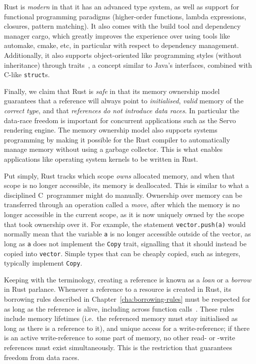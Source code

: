 \documentclass[11pt,a4paper,twoside,openany,draft]{report}
\newcommand{\InRust}[1]{\texttt{#1}}
\begin{document}
Rust is \textit{modern} in that it has an advanced type system, as well as
support for functional programming paradigms (higher-order functions, lambda
expressions, closures, pattern matching). It also comes with the build tool and
dependency manager cargo, which greatly improves the experience over using tools
like automake, cmake, etc, in particular with respect to dependency management.
Additionally, it also supports object-oriented like programming styles (without
inheritance) through traits~\cite{scharli2003traits}, a concept similar to
Java's interfaces, combined with C-like \InRust{struct}s.

Finally, we claim that Rust is \textit{safe} in that its memory ownership model
guarantees that a reference will always point to \textit{initialised},
\textit{valid} memory of the \textit{correct type}, and that \textit{references
  do not introduce data races}. In particular the data-race freedom is important
for concurrent applications such as the Servo rendering engine. The memory
ownership model also supports systems programming by making it possible for the
Rust compiler to automatically manage memory without using a garbage collector.
This is what enables applications like operating system kernels to be written in
Rust.

Put simply, Rust tracks which scope \textit{owns} allocated memory, and when
that scope is no longer accessible, its memory is deallocated. This is similar
to what a disciplined C~programmer might do manually. Ownership over memory can
be transferred through an operation called a \textit{move}, after which the
memory is no longer accessible in the current scope, as it is now uniquely owned
by the scope that took ownership over it. For example, the statement
\InRust{vector.push(a)} would normally mean that the variable \InRust{a} is no
longer accessible outside of the vector, as long as \InRust{a} does not
implement the \InRust{Copy} trait, signalling that it should instead be copied
into \InRust{vector}. Simple types that can be cheaply copied, such as integers,
typically implement \InRust{Copy}.

Keeping with the terminology, creating a reference is known as a \textit{loan}
or a \textit{borrow} in Rust parlance. Whenever a reference to a resource is
created in Rust, its borrowing rules described in
Chapter~\ref{cha:borrowing-rules} must be respected for as long as the reference
is alive, including across function calls~\cite{nichols_rust_nodate}. These
rules include memory lifetimes (i.e.\ the referenced memory must stay initialised
as long as there is a reference to it), and unique access for a write-reference;
if there is an active write-reference to some part of memory, no other read- or
-write references must exist simultaneously. This is the restriction that
guarantees freedom from data races.
\end{document}
